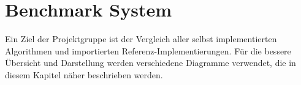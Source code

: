 \section{Benchmark System}
\label{framework:benchmarks}

Ein  Ziel der Projektgruppe \sacabench ist der Vergleich aller selbst implementierten Algorithmen und importierten Referenz-Implementierungen. Für die bessere Übersicht und Darstellung werden verschiedene Diagramme verwendet, die in diesem Kapitel näher beschrieben werden.






